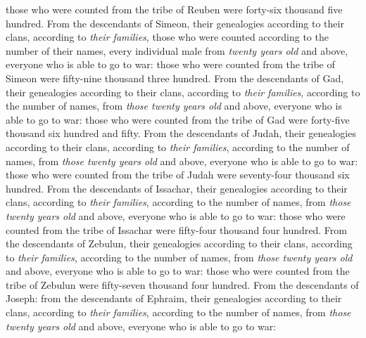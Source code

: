\begin{biblechapter}
\verse those who were counted from the tribe of Reuben were forty-six thousand five hundred.
\verse From the descendants of Simeon, their genealogies according to their clans, according to \textit{their families}, those who were counted according to the number of their names, every individual male from \textit{twenty years old} and above, everyone who is able to go to war:
\verse those who were counted from the tribe of Simeon were fifty-nine thousand three hundred.
\verse From the descendants of Gad, their genealogies according to their clans, according to \textit{their families}, according to the number of names, from \textit{those twenty years old} and above, everyone who is able to go to war:
\verse those who were counted from the tribe of Gad were forty-five thousand six hundred and fifty.
\verse From the descendants of Judah, their genealogies according to their clans, according to \textit{their families}, according to the number of names, from \textit{those twenty years old} and above, everyone who is able to go to war:
\verse those who were counted from the tribe of Judah were seventy-four thousand six hundred.
\verse From the descendants of Issachar, their genealogies according to their clans, according to \textit{their families}, according to the number of names, from \textit{those twenty years old} and above, everyone who is able to go to war:
\verse those who were counted from the tribe of Issachar were fifty-four thousand four hundred.
\verse From the descendants of Zebulun, their genealogies according to their clans, according to \textit{their families}, according to the number of names, from \textit{those twenty years old} and above, everyone who is able to go to war:
\verse those who were counted from the tribe of Zebulun were fifty-seven thousand four hundred.
\verse From the descendants of Joseph: from the descendants of Ephraim, their genealogies according to their clans, according to \textit{their families}, according to the number of names, from \textit{those twenty years old} and above, everyone who is able to go to war:

\end{biblechapter}
